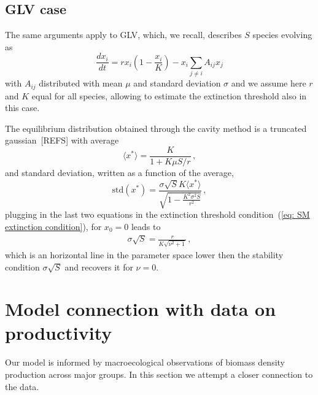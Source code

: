 \documentclass[10pt]{article}
\begin{document}
\subsection{GLV case}

The same arguments apply to GLV, which, we recall, describes $S$ species evolving as
\begin{equation}
    \frac{dx_i}{dt} = rx_i(1-\frac{x_i}{K}) - x_i\sum_{j\neq i}A_{ij}x_j
\end{equation}
with $A_{ij}$ distributed with mean $\mu$ and standard deviation $\sigma$
and we assume here $r$ and $K$ equal for all species,
allowing to estimate the extinction threshold also in this case.

The equilibrium distribution obtained through the cavity method is
a truncated gaussian~[REFS] with average
\begin{equation}
    \langle x^* \rangle = \frac{K}{1+K\mu S/r} \, ,
\end{equation}
and standard deviation, written as a function of the average,
\begin{equation}
    \textrm{std}(x^*) = \frac{\sigma\sqrt{S}K\langle x^* \rangle}{\sqrt{1-\frac{K^2\sigma^2S}{r^2}}} \, ,
\end{equation}
plugging in the last two equations in the extinction 
threshold condition~(\ref{eq: SM extinction condition}), for $x_0=0$
leads to 
\begin{eqnarray}
    \sigma\sqrt{S} = \frac{r}{K\sqrt{\nu^2+1}} \, ,
\end{eqnarray}
which is an horizontal line in the parameter space 
lower then the stability condition $\sigma\sqrt{S}$ and recovers it for $\nu=0$.

\section{Model connection with data on productivity}
Our model is informed by macroecological observations
of biomass density production across major groups.
In this section we attempt a closer connection to the data.
\end{document}
